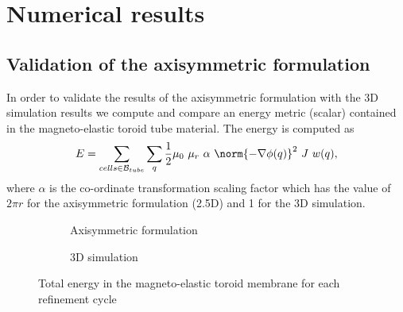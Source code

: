 \section{Numerical results}
\subsection{Validation of the axisymmetric formulation}
In order to validate the results of the axisymmetric formulation with the 3D simulation results we compute and compare an energy metric (scalar) contained in the magneto-elastic toroid tube material. The energy is computed as
\begin{equation}
E = \sum\limits_{cells \in \mathcal{B}_{tube}} \sum\limits_{q} \frac{1}{2} \mu_0 \ \mu_r \ \alpha \ \norm{-\nabla \phi(q)}^2 \ J \ w(q),
\end{equation}
where $\alpha$ is the co-ordinate transformation scaling factor which has the value of $2 \pi r$ for the axisymmetric formulation (2.5D) and 1 for the 3D simulation.\par 

\begin{figure}[t!]
\begin{subfigure}[t]{0.49\linewidth}
\centering
{}
\caption{Axisymmetric formulation}
\label{fig:1.4.1}
\end{subfigure}
\begin{subfigure}[t]{0.46\linewidth}
\centering
{}
\caption{3D simulation}
\label{fig:1.4.2}
\end{subfigure}
\caption{Total energy in the magneto-elastic toroid membrane for each refinement cycle}
\label{fig:1.4}
\end{figure} \par 

